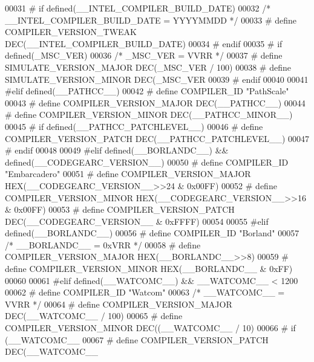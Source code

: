 \begin{DoxyCode}
{{{00031 \textcolor{preprocessor}{# if defined(\_\_INTEL\_COMPILER\_BUILD\_DATE)}
00032   \textcolor{comment}{/* \_\_INTEL\_COMPILER\_BUILD\_DATE = YYYYMMDD */}
00033 \textcolor{preprocessor}{#  define COMPILER\_VERSION\_TWEAK DEC(\_\_INTEL\_COMPILER\_BUILD\_DATE)}
00034 \textcolor{preprocessor}{# endif}
00035 \textcolor{preprocessor}{# if defined(\_MSC\_VER)}
00036    \textcolor{comment}{/* \_MSC\_VER = VVRR */}
00037 \textcolor{preprocessor}{#  define SIMULATE\_VERSION\_MAJOR DEC(\_MSC\_VER / 100)}
00038 \textcolor{preprocessor}{#  define SIMULATE\_VERSION\_MINOR DEC(\_MSC\_VER %
00039 \textcolor{preprocessor}{# endif}
00040 
00041 \textcolor{preprocessor}{#elif defined(\_\_PATHCC\_\_)}
00042 \textcolor{preprocessor}{# define COMPILER\_ID "PathScale"}
00043 \textcolor{preprocessor}{# define COMPILER\_VERSION\_MAJOR DEC(\_\_PATHCC\_\_)}
00044 \textcolor{preprocessor}{# define COMPILER\_VERSION\_MINOR DEC(\_\_PATHCC\_MINOR\_\_)}
00045 \textcolor{preprocessor}{# if defined(\_\_PATHCC\_PATCHLEVEL\_\_)}
00046 \textcolor{preprocessor}{#  define COMPILER\_VERSION\_PATCH DEC(\_\_PATHCC\_PATCHLEVEL\_\_)}
00047 \textcolor{preprocessor}{# endif}
00048 
00049 \textcolor{preprocessor}{#elif defined(\_\_BORLANDC\_\_) && defined(\_\_CODEGEARC\_VERSION\_\_)}
00050 \textcolor{preprocessor}{# define COMPILER\_ID "Embarcadero"}
00051 \textcolor{preprocessor}{# define COMPILER\_VERSION\_MAJOR HEX(\_\_CODEGEARC\_VERSION\_\_>>24 & 0x00FF)}
00052 \textcolor{preprocessor}{# define COMPILER\_VERSION\_MINOR HEX(\_\_CODEGEARC\_VERSION\_\_>>16 & 0x00FF)}
00053 \textcolor{preprocessor}{# define COMPILER\_VERSION\_PATCH DEC(\_\_CODEGEARC\_VERSION\_\_     & 0xFFFF)}
00054 
00055 \textcolor{preprocessor}{#elif defined(\_\_BORLANDC\_\_)}
00056 \textcolor{preprocessor}{# define COMPILER\_ID "Borland"}
00057   \textcolor{comment}{/* \_\_BORLANDC\_\_ = 0xVRR */}
00058 \textcolor{preprocessor}{# define COMPILER\_VERSION\_MAJOR HEX(\_\_BORLANDC\_\_>>8)}
00059 \textcolor{preprocessor}{# define COMPILER\_VERSION\_MINOR HEX(\_\_BORLANDC\_\_ & 0xFF)}
00060 
00061 \textcolor{preprocessor}{#elif defined(\_\_WATCOMC\_\_) && \_\_WATCOMC\_\_ < 1200}
00062 \textcolor{preprocessor}{# define COMPILER\_ID "Watcom"}
00063    \textcolor{comment}{/* \_\_WATCOMC\_\_ = VVRR */}
00064 \textcolor{preprocessor}{# define COMPILER\_VERSION\_MAJOR DEC(\_\_WATCOMC\_\_ / 100)}
00065 \textcolor{preprocessor}{# define COMPILER\_VERSION\_MINOR DEC((\_\_WATCOMC\_\_ / 10) %
00066 \textcolor{preprocessor}{# if (\_\_WATCOMC\_\_ %
00067 \textcolor{preprocessor}{#  define COMPILER\_VERSION\_PATCH DEC(\_\_WATCOMC\_\_ %
}}}}}}}
\end{DoxyCode}

